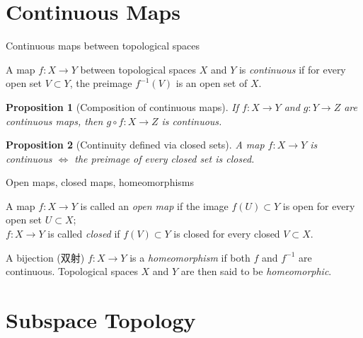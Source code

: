 \documentclass[10pt]{beamer}
\newtheorem{proposition}{Proposition}
\begin{document}
\section{Continuous Maps}

\begin{frame}{Continuous maps between topological spaces}
	\begin{definition}
		A map $f: X \to Y$ between topological spaces $X$ and $Y$ is
		\emph{continuous} if for every open set $V \subset Y$, the preimage
		$f^{-1}(V)$ is an open set of $X$.
	\end{definition}
	\begin{proposition}[Composition of continuous maps]
		If $f: X \to Y$ and $g: Y \to Z$ are continuous maps, then
		$g \circ f: X \to Z$ is continuous.
	\end{proposition}
	\begin{proposition}[Continuity defined via closed sets]
		A map $f: X \to Y$ is continuous $\iff$ the preimage of every closed set
		is closed.
	\end{proposition}
\end{frame}

\begin{frame}{Open maps, closed maps, homeomorphisms}
	\begin{definition}
		A map $f: X \to Y$ is called an \emph{open map} if the image
		$f(U) \subset Y$ is open for every open set $U \subset X$;\\
		$f: X \to Y$ is called \emph{closed} if $f(V) \subset Y$ is closed for
		every closed $V \subset X$.
	\end{definition}
	\begin{definition}[Homeomorphism (同胚)]
		A bijection (双射) $f: X \to Y$ is a \emph{homeomorphism} if both $f$ and
		$f^{-1}$ are continuous. Topological spaces $X$ and $Y$ are then said to
		be \emph{homeomorphic}.
	\end{definition}
\end{frame}

\section{Subspace Topology}
\end{document}
